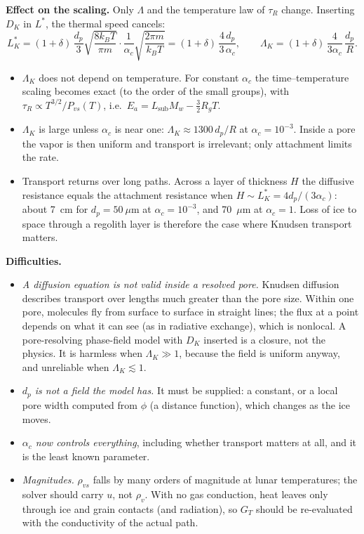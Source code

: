 \documentclass[11pt]{article}
\newcommand{\rvs}{\rho_{vs}}
\begin{document}
\textbf{Effect on the scaling.} Only $\Lambda$ and the temperature law of
$\tau_{R}$ change. Inserting $D_K$ in $L^{*}$, the thermal speed cancels:
\begin{equation}
L^{*}_K = (1+\delta)\,\frac{d_p}{3}\sqrt{\frac{8k_BT}{\pi m}}\cdot\frac{1}{\alpha_c}\sqrt{\frac{2\pi m}{k_BT}}
 = (1+\delta)\,\frac{4\,d_p}{3\,\alpha_c} ,
\qquad
\Lambda_K = (1+\delta)\,\frac{4}{3\alpha_c}\,\frac{d_p}{R} .
\label{eq:LK}
\end{equation}
\begin{itemize}
\item $\Lambda_K$ does not depend on temperature. For constant $\alpha_c$
  the time--temperature scaling becomes exact (to the order of the small
  groups), with $\tau_{R} \propto T^{3/2}/P_{vs}(T)$, i.e.\ $E_a =
  L_{\mathrm{sub}}M_w - \tfrac32R_gT$.
\item $\Lambda_K$ is large unless $\alpha_c$ is near one: $\Lambda_K \approx
  1300\,d_p/R$ at $\alpha_c = 10^{-3}$. Inside a pore the vapor is then
  uniform and transport is irrelevant; only attachment limits the rate.
\item Transport returns over long paths. Across a layer of thickness $H$ the
  diffusive resistance equals the attachment resistance when $H \sim L^{*}_K
  = 4d_p/(3\alpha_c)$: about 7~cm for $d_p = 50~\mu$m at $\alpha_c =
  10^{-3}$, and 70~$\mu$m at $\alpha_c = 1$. Loss of ice to space through a
  regolith layer is therefore the case where Knudsen transport matters.
\end{itemize}

\textbf{Difficulties.}
\begin{itemize}
\item \emph{A diffusion equation is not valid inside a resolved pore.}
  Knudsen diffusion describes transport over lengths much greater than the
  pore size. Within one pore, molecules fly from surface to surface in
  straight lines; the flux at a point depends on what it can see (as in
  radiative exchange), which is nonlocal. A pore-resolving phase-field
  model with $D_K$ inserted is a closure, not the physics. It is harmless
  when $\Lambda_K \gg 1$, because the field is uniform anyway, and
  unreliable when $\Lambda_K \lesssim 1$.
\item \emph{$d_p$ is not a field the model has.} It must be supplied: a
  constant, or a local pore width computed from $\phi$ (a distance
  function), which changes as the ice moves.
\item \emph{$\alpha_c$ now controls everything}, including whether transport
  matters at all, and it is the least known parameter.
\item \emph{Magnitudes.} $\rvs$ falls by many orders of magnitude at lunar
  temperatures; the solver should carry $u$, not $\rho_v$. With no gas
  conduction, heat leaves only through ice and grain contacts (and
  radiation), so $G_T$ should be re-evaluated with the conductivity of the
  actual path.
\end{itemize}
\end{document}
